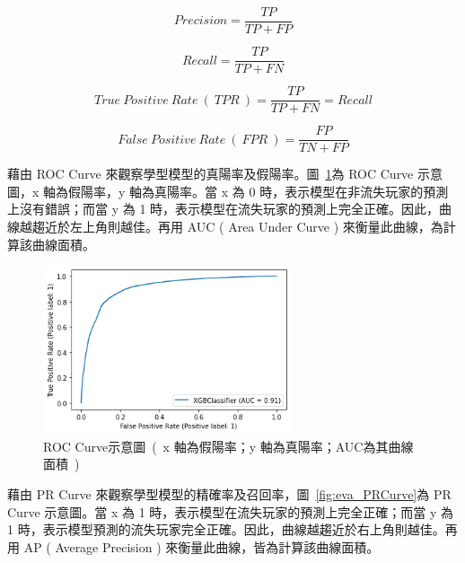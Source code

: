 \begin{equation}
    \label{eq:PrecisionFormula}
    Precision = \frac{TP}{TP + FP}
\end{equation}

\begin{equation}
    \label{eq:RecallFormula}
    Recall = \frac{TP}{TP + FN}
\end{equation}

\begin{equation}
    \label{eq:TPRFormula}
    True\ Positive\ Rate\ (\ TPR\ ) = \frac{TP}{TP + FN} = Recall
\end{equation}

\begin{equation}
    \label{eq:FPRFormula}
    False\ Positive\ Rate\ (\ FPR\ ) = \frac{FP}{TN + FP}
\end{equation}

藉由 ROC Curve 來觀察學型模型的真陽率及假陽率。圖~\ref{fig:eva_ROCCurve}為 ROC Curve 示意圖，x 軸為假陽率，y 軸為真陽率。當 x 為 0 時，表示模型在非流失玩家的預測上沒有錯誤；而當 y 為 1 時，表示模型在流失玩家的預測上完全正確。因此，曲線越趨近於左上角則越佳。再用 AUC ( Area Under Curve ) 來衡量此曲線，為計算該曲線面積。

\begin{figure}[!htb]
    \begin{center}
      \includegraphics[width=0.65\textwidth]{figures/evaluation/Image_ROCCurve.png}
      \caption[ROC Curve示意圖]{ROC Curve示意圖\ (\ x 軸為假陽率；y 軸為真陽率；AUC為其曲線面積\ )}
      \label{fig:eva_ROCCurve}
    \end{center}
\end{figure}

藉由 PR Curve 來觀察學型模型的精確率及召回率，圖~\ref{fig:eva_PRCurve}為 PR Curve 示意圖。當 x 為 1 時，表示模型在流失玩家的預測上完全正確；而當 y 為 1 時，表示模型預測的流失玩家完全正確。因此，曲線越趨近於右上角則越佳。再用 AP ( Average Precision ) 來衡量此曲線，皆為計算該曲線面積。

